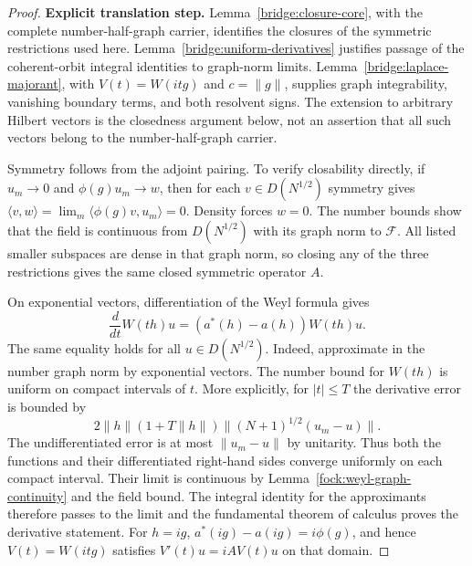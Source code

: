 \documentclass[11pt,a4paper]{article}
\theoremstyle{definition}
\theoremstyle{remark}
\begin{document}
\begin{proof}
\noindent\textbf{Explicit translation step.} Lemma~\ref{bridge:closure-core}, with the complete number-half-graph
carrier, identifies the closures of the symmetric restrictions used
here. Lemma~\ref{bridge:uniform-derivatives} justifies passage of the
coherent-orbit integral identities to graph-norm limits.
Lemma~\ref{bridge:laplace-majorant}, with $V(t)=W(itg)$ and
$c=\|g\|$, supplies graph integrability, vanishing boundary terms, and
both resolvent signs. The extension to arbitrary Hilbert vectors is the
closedness argument below, not an assertion that all such vectors
belong to the number-half-graph carrier.

Symmetry follows from the adjoint pairing. To verify closability
directly, if $u_m\to0$ and $\phi(g)u_m\to w$, then for each
$v\in D(N^{1/2})$ symmetry gives
$\langle v,w\rangle=\lim_m\langle\phi(g)v,u_m\rangle=0$.
Density forces $w=0$. The number bounds show that
the field is continuous from $D(N^{1/2})$ with its graph norm to
$\mathcal F$. All listed smaller subspaces are dense in that graph
norm, so closing any of the three restrictions gives the same closed
symmetric operator $A$.

On exponential vectors, differentiation of the Weyl formula gives
\[
 \frac{d}{dt}W(th)u=(a^*(h)-a(h))W(th)u.
\]
The same equality holds for all $u\in D(N^{1/2})$. Indeed,
approximate in the number graph norm by exponential vectors. The
number bound for $W(th)$ is uniform on compact intervals of $t$.
More explicitly, for $|t|\leq T$ the derivative error is bounded by
\[
 2\|h\|(1+T\|h\|)
           \|(N+1)^{1/2}(u_m-u)\|.
\]
The undifferentiated error is at most $\|u_m-u\|$ by unitarity.
Thus both the functions and their differentiated right-hand sides
converge uniformly on each compact interval.
Their limit is continuous by Lemma~\ref{fock:weyl-graph-continuity}
and the field bound. The integral identity for the approximants
therefore passes to the limit and the fundamental theorem of calculus
proves the derivative statement.
For $h=ig$, $a^*(ig)-a(ig)=i\phi(g)$, and hence
$V(t)=W(itg)$ satisfies $V'(t)u=iAV(t)u$ on that domain.


\end{proof}
\end{document}
